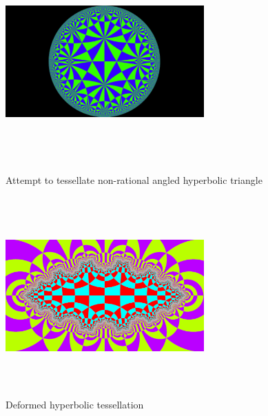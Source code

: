 \begin{figure}[htbp]
  \begin{minipage}[t]{0.49\hsize}
   \center
   \includegraphics[width=3in, height=3in, keepaspectratio]{../img/tessellation/failed.pdf}
   \caption{Attempt to tessellate non-rational angled hyperbolic triangle}
   \label{fig:failed}
  \end{minipage}
 \hspace*{\fill}
 \begin{minipage}[t]{0.49\hsize}
  \center
  \includegraphics[width=3in, height=3in, keepaspectratio]{../img/tessellation/deformed.pdf}
  \caption{Deformed hyperbolic tessellation}
  \label{fig:deformed}
 \end{minipage}
\end{figure}

\clearpage